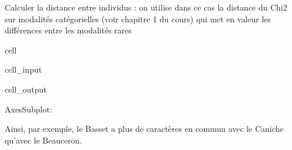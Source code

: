 \documentclass[letterpaper,10pt,french]{sphinxmanual}
\begin{document}
\sphinxAtStartPar
Calculer la distance entre individus : on utilise dans ce cas la distance du Chi2 sur modalités catégorielles (voir chapitre 1 du cours) qui met en valeur les différences entre les modalités rares

\begin{sphinxuseclass}{cell}
\begin{sphinxuseclass}{cell_input}
\begin{sphinxVerbatim}[commandchars=\\\{\}]
   

  


 
\end{sphinxVerbatim}

\end{sphinxuseclass}
\begin{sphinxuseclass}{cell_output}
\begin{sphinxVerbatim}[commandchars=\\\{\}]
\PYGZlt{}AxesSubplot:\PYGZgt{}
\end{sphinxVerbatim}

\noindent{}

\end{sphinxuseclass}
\end{sphinxuseclass}
\sphinxAtStartPar
Ainsi, par exemple, le Basset a plus de caractères en commun avec le Caniche qu’avec le Beauceron.
\end{document}
